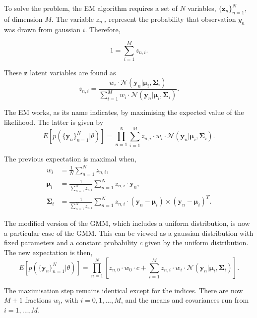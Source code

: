 To solve the problem, the EM algorithm requires  a set of $N$ variables, $\{\boldsymbol{z}_n\}_{n=1}^N$, of dimension $M$. The variable $z_{n,i}$ represent the probability that observation $y_n$ was drawn from gaussian $i$. Therefore,

\begin{equation}
1=\sum_{i=1}^M z_{n,i}.
\end{equation}

These $\boldsymbol{z}$ latent variables are found as
\begin{equation}
z_{n,i}= \frac{w_i\cdot \mathcal{N}(\mathbf{y}_n|\boldsymbol{\mu}_i,\boldsymbol{\Sigma}_i)}{\sum_{i=1}^M w_i\cdot \mathcal{N}(\mathbf{y}_n|\boldsymbol{\mu}_i,\boldsymbol{\Sigma}_i)}.
\end{equation}

The EM works, as its name indicates, by maximising the expected value of the likelihood. The latter is given by
\begin{equation}
E[p(\{\mathbf{y}_n\}_{n=1}^N|\theta)]=\prod_{n=1}^N {\sum_{i=1} ^M {z_{n,i}\cdot w_i\cdot \mathcal{N}(\mathbf{y}_n|\boldsymbol{\mu}_i,\boldsymbol{\Sigma}_i)}}.
\end{equation}

The previous expectation is maximal when,
\begin{align}
w_i &= \frac{1}{N} \sum_{n=1}^N z_{n,i}, \\
\boldsymbol{\mu}_i &= \frac{1}{\sum_{n=1}^N z_{n,i}} \sum_{n=1}^N z_{n,i}\cdot \mathbf{y}_n,\\
\boldsymbol{\Sigma}_i &= \frac{1}{\sum_{n=1}^N z_{n,i}} \sum_{n=1}^N z_{n,i}\cdot (\mathbf{y}_n - \boldsymbol{\mu}_i)\times(\mathbf{y}_n-\boldsymbol{\mu}_i)^T.
\end{align}

The modified version of the GMM, which includes a uniform distribution, is now a particular case of the GMM. This can be viewed as a gaussian distribution with fixed parameters and a constant probability $c$ given by the uniform distribution. The new expectation is then,
\begin{equation}
E[p(\{\mathbf{y}_n\}_{n=1}^N|\theta)]=\prod_{n=1}^N {\left[z_{n,0}\cdot w_0 \cdot c + \sum_{i=1} ^M {z_{n,i}\cdot w_i\cdot \mathcal{N}(\mathbf{y}_n|\boldsymbol{\mu}_i,\boldsymbol{\Sigma}_i)}\right]}.
\end{equation}

The maximisation step remains identical except for the indices. There are now $M+1$ fractions $w_i$, with $i=0,1,...,M$, and the means and covariances run from $i=1,...,M$.

